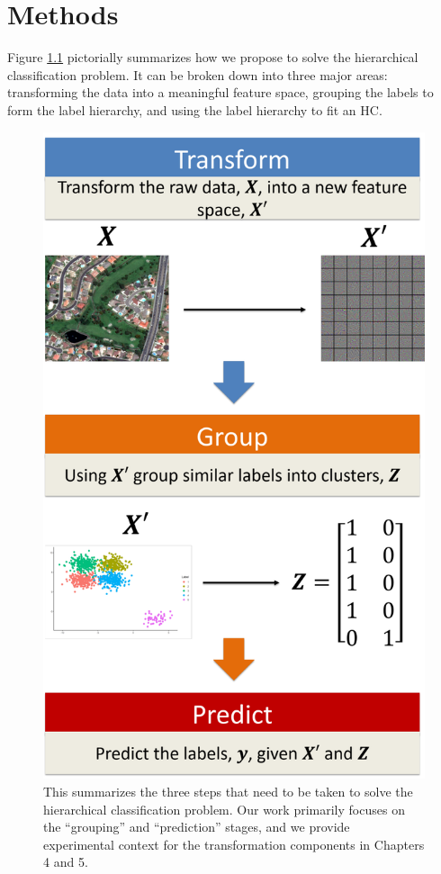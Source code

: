 \documentclass[../thesis.tex]{subfiles}
\begin{document}
\chapter{Methods}
Figure \ref{fig:hc-approach} pictorially summarizes how we propose to solve the hierarchical classification problem. It can be broken down into three major areas: transforming the data into a meaningful feature space, grouping the labels to form the label hierarchy, and using the label hierarchy to fit an HC.

\begin{figure}
    \centering
    \includegraphics[width=.9\linewidth]{images/approach.pdf}
    \caption[Hierarchical Classification Approach]{This summarizes the three steps that need to be taken to solve the hierarchical classification problem. Our work primarily focuses on the ``grouping'' and ``prediction'' stages, and we provide experimental context for the transformation components in Chapters 4 and 5.}
    \label{fig:hc-approach}
\end{figure}
\end{document}

